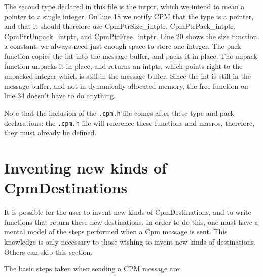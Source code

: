 The second type declared in this file is the intptr, which we intend
to mean a pointer to a single integer.  On line 18 we notify CPM that
the type is a pointer, and that it should therefore use
CpmPtrSize_intptr, CpmPtrPack_intptr, CpmPtrUnpack_intptr, and
CpmPtrFree_intptr.  Line 20 shows the size function, a constant: we
always need just enough space to store one integer.  The pack function
copies the int into the message buffer, and packs it in place.  The
unpack function unpacks it in place, and returns an intptr, which
points right to the unpacked integer which is still in the message
buffer.  Since the int is still in the message buffer, and not in
dynamically allocated memory, the free function on line 34 doesn't
have to do anything.

Note that the inclusion of the {\tt .cpm.h} file comes after these
type and pack declarations: the {\tt .cpm.h} file will reference these
functions and macros, therefore, they must already be defined.

\section{Inventing new kinds of CpmDestinations}

It is possible for the user to invent new kinds of CpmDestinations,
and to write functions that return these new destinations.  In order
to do this, one must have a mental model of the steps performed when a
Cpm message is sent.  This knowledge is only necessary to those
wishing to invent new kinds of destinations.  Others can skip this
section.

\pagebreak
The basic steps taken when sending a CPM message are:

